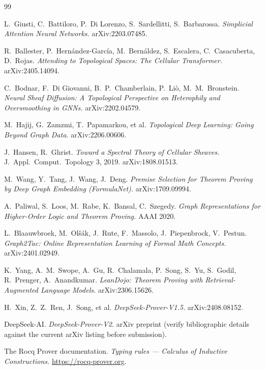 \documentclass[11pt]{article}
\theoremstyle{definition}
\theoremstyle{plain}
\begin{document}
\begin{thebibliography}{99}

L.\ Giusti, C.\ Battiloro, P.\ Di Lorenzo, S.\ Sardellitti, S.\ Barbarossa.
\emph{Simplicial Attention Neural Networks.}
arXiv:2203.07485.

R.\ Ballester, P.\ Hern\'andez-Garc\'ia, M.\ Bern\'aldez, S.\ Escalera, C.\ Casacuberta, D.\ Rojas.
\emph{Attending to Topological Spaces: The Cellular Transformer.}
arXiv:2405.14094.

C.\ Bodnar, F.\ Di Giovanni, B.\ P.\ Chamberlain, P.\ Li\`o, M.\ M.\ Bronstein.
\emph{Neural Sheaf Diffusion: A Topological Perspective on Heterophily and Oversmoothing in GNNs.}
arXiv:2202.04579.

M.\ Hajij, G.\ Zamzmi, T.\ Papamarkou, et al.
\emph{Topological Deep Learning: Going Beyond Graph Data.}
arXiv:2206.00606.

J.\ Hansen, R.\ Ghrist.
\emph{Toward a Spectral Theory of Cellular Sheaves.}
J.\ Appl.\ Comput.\ Topology 3, 2019. arXiv:1808.01513.

M.\ Wang, Y.\ Tang, J.\ Wang, J.\ Deng.
\emph{Premise Selection for Theorem Proving by Deep Graph Embedding (FormulaNet).}
arXiv:1709.09994.

A.\ Paliwal, S.\ Loos, M.\ Rabe, K.\ Bansal, C.\ Szegedy.
\emph{Graph Representations for Higher-Order Logic and Theorem Proving.}
AAAI 2020.

L.\ Blaauwbroek, M.\ Ol\v{s}\'ak, J.\ Rute, F.\ Massolo, J.\ Piepenbrock, V.\ Pestun.
\emph{Graph2Tac: Online Representation Learning of Formal Math Concepts.}
arXiv:2401.02949.

K.\ Yang, A.\ M.\ Swope, A.\ Gu, R.\ Chalamala, P.\ Song, S.\ Yu, S.\ Godil, R.\ Prenger, A.\ Anandkumar.
\emph{LeanDojo: Theorem Proving with Retrieval-Augmented Language Models.}
arXiv:2306.15626.

H.\ Xin, Z.\ Z.\ Ren, J.\ Song, et al.
\emph{DeepSeek-Prover-V1.5.}
arXiv:2408.08152.

DeepSeek-AI.
\emph{DeepSeek-Prover-V2.}
arXiv preprint (verify bibliographic details against the current arXiv listing before submission).

The Rocq Prover documentation.
\emph{Typing rules --- Calculus of Inductive Constructions.}
\url{https://rocq-prover.org}.

\end{thebibliography}
\end{document}
